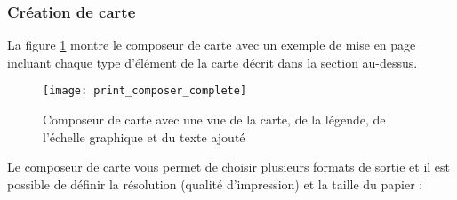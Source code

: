\subsubsection{Création de carte}

La figure \ref{fig:print_composer_complete} montre le composeur de carte avec
un exemple de mise en page incluant chaque type d'élément de la carte décrit
dans la section au-dessus.

\begin{figure}[h]
   \begin{center}
\caption{Composeur de carte avec une vue de la carte, de la légende, de
l'échelle graphique et du texte ajouté
\nixcaption}
   \label{fig:print_composer_complete}\smallskip
   \texttt{[image: print\_composer\_complete]}
\end{center}
\end{figure}

Le composeur de carte vous permet de choisir plusieurs formats de sortie et il
est possible de définir la résolution (qualité d'impression) et la taille du
papier :

